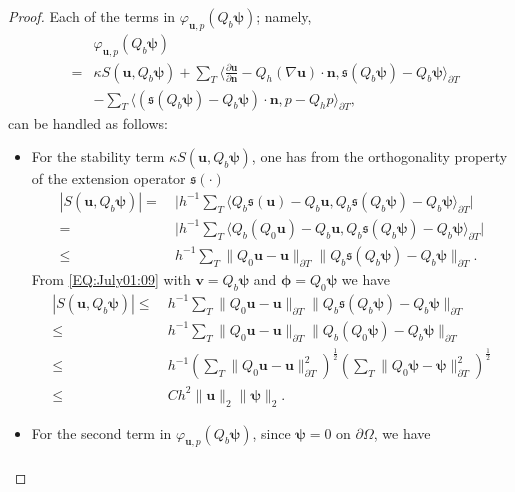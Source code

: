 \documentclass[final,leqno]{siamltex704}
\def\S{{\mathfrak s}}
\def\pT{{\partial T}}
\begin{document}
\begin{proof}
Each of the terms in $\varphi_{\bm{u},p}(Q_b \bm{\psi})$; namely,
\begin{eqnarray*}
& & \varphi_{\bm{u},p}(Q_b \bm{\psi})\\
&=&\kappa {S}(\bm{u}, Q_b \bm{\psi})
+\sum_{T}\langle \frac{\partial \bm{u}}{\partial \bm{n}}- Q_h(\nabla \bm{u})\cdot\bm{n},\S(Q_b\bm{\psi})-Q_b\bm{\psi}\rangle_{\partial T}\\
&& -\sum_{T} \langle (\S(Q_b \bm{\psi})-Q_b \bm{\psi})\cdot \bm{n},p - Q_h p\rangle_{\partial T},\nonumber
\end{eqnarray*}
can be handled as follows:
\begin{itemize}
\item For the stability term $\kappa {S}(\bm{u},Q_b\bm{\psi})$, one has from the orthogonality property of the extension operator $\S(\cdot)$
\begin{equation*}%
\begin{split}
|{S}(\bm{u}, Q_b \bm{\psi})|=&\ \bigg|h^{-1}\sum_T\langle Q_b \S(\bm{u})- Q_b\bm{u}, Q_b\S(Q_b \bm{\psi}) - Q_b \bm{\psi}\rangle_\pT \bigg| \\
=&\ \bigg|h^{-1}\sum_T\langle Q_b(Q_0 \bm{u})- Q_b\bm{u}, Q_b\S(Q_b \bm{\psi}) - Q_b \bm{\psi}\rangle_\pT \bigg| \\
\leq &\ h^{-1}\sum_T \|Q_0\bm{u}-\bm{u}\|_\pT \|Q_b\S(Q_b \bm{\psi}) - Q_b \bm{\psi}\|_\pT.
\end{split}
\end{equation*}
From \eqref{EQ:July01:09} with $\bm{v}=Q_b \bm{\psi}$ and $\bm{\phi}=Q_0\bm{\psi}$ we have
\begin{equation}\label{equ.EL2.1}
\begin{split}
|{S}(\bm{u}, Q_b \bm{\psi})| \leq &\ h^{-1}\sum_T \|Q_0\bm{u}-\bm{u}\|_\pT \|Q_b\S(Q_b \bm{\psi}) - Q_b \bm{\psi}\|_\pT\\
\leq &\ h^{-1}\sum_T \|Q_0\bm{u}-\bm{u}\|_\pT \|Q_b(Q_0\bm{\psi}) - Q_b \bm{\psi}\|_\pT\\
\leq& \ h^{-1} \left( \sum_{T}\|Q_0 \bm{u}- \bm{u}\|_{\partial T}^2 \right)^{\frac{1}{2}}\left( \sum_{T}\|Q_0 \bm{\psi}- \bm{\psi}\|_{\partial T}^2 \right)^{\frac{1}{2}} \\
\leq&\ Ch^2\|\bm{u}\|_2\|\bm{\psi}\|_2.
\end{split}
\end{equation}
\item For the second term in $\varphi_{\bm{u},p}(Q_b \bm{\psi})$, since $\bm{\psi}=0$ on $\partial \Omega$, we have
\begin{eqnarray*}

\end{eqnarray*}
\end{itemize}
\end{proof}
\end{document}
